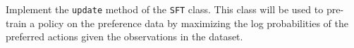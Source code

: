 \item {}

Implement the \texttt{update} method of the \texttt{SFT} class. This class will be used to pre-train a policy on the preference data by maximizing the log probabilities of the preferred actions given the observations in the dataset.
